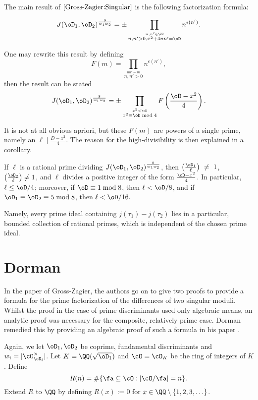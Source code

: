 \documentclass[11pt, proquest]{uwthesis}
\begin{document}
The main result of $\cite{Gross-Zagier:Singular}$ is the following factorization formula:

\begin{theorem}
  $$J(\oD_1,\oD_2)^{\frac{8}{w_1w_2}} = \pm \prod_{\stackrel{n,n'\in\ZZ}{n,n'>0, x^2 + 4nn' = \oD}}n^{\epsilon(n')}.$$
\end{theorem}

One may rewrite this result by defining
$$F(m) = \prod_{\stackrel{nn'=m}{n,n'>0}} n^{\epsilon(n')},$$
then the result can be stated
$$J(\oD_1,\oD_2)^{\frac{8}{w_1w_2}} = \pm \prod_{\stackrel{x^2<\oD}{x^2\equiv \oD\bmod 4}} F\left(\frac{\oD-x^2}{4}\right).$$

It is not at all obvious apriori, but these $F(m)$ are powers of a single prime, namely an $\ell\mid \frac{D-x^2}{4}$.
The reason for the high-divisibility is then explained in a corollary.

\begin{corollary}
  If $\ell$ is a rational prime dividing $J(\oD_1,\oD_2)^{\frac{8}{w_1w_2}}$, then $\left(\frac{\oD_1}{\ell}\right)~\ne~1$, $\left(\frac{\oD_2}{\ell}\right)\ne 1$, and $\ell$ divides a positive integer of the form $\frac{\oD-x^2}{4}$. In particular, $\ell\leq \oD/4$; moreover, if $\oD\equiv 1\bmod 8$, then $\ell <\oD/8$, and if $\oD_1\equiv \oD_2\equiv 5\bmod 8$, then $\ell < \oD/16.$
\end{corollary}

Namely, every prime ideal containing $j(\tau_1)-j(\tau_2)$ lies in a particular, bounded collection of rational primes, which is independent of the chosen prime ideal.

\section{Dorman}\label{Dorman:Sec}

In the paper of Gross-Zagier, the authors go on to give two proofs to provide a formula for the prime factorization of the differences of two singular moduli.
Whilst the proof in the case of prime discriminants used only algebraic means, an analytic proof was necessary for the composite, relatively prime case.
Dorman remedied this by providing an algebraic proof of such a formula in his paper \cite{Dorman:elliptic_modular}.

Again, we let $\oD_1,\oD_2$ be coprime, fundamental discriminants and $w_i = |\cO_{\oD_i}^\times|$.
Let $K = \QQ(\sqrt{\oD_1})$ and $\cO = \cO_K$ be the ring of integers of $K$. Define
$$R(n) = \#\{\fa\subseteq \cO: |\cO/\fa| = n\}.$$
Extend $R$ to $\QQ$ by defining $R(x) := 0$ for $x\in\QQ\setminus\{1,2,3,\ldots\}$.
\end{document}
